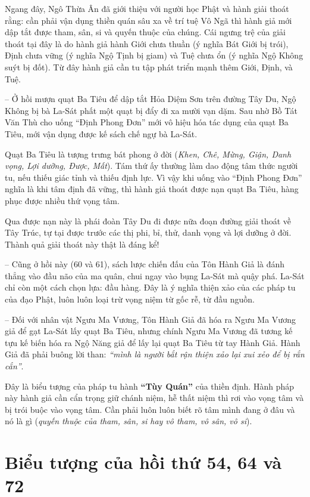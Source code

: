 Ngang đây, Ngô Thừa Ân đã giới thiệu với người học Phật và hành giải thoát rằng: cần phải vận dụng thiền quán sâu xa về trí tuệ Vô Ngã thì hành giả mới dập tắt được tham, sân, si và quyến thuộc của chúng. Cái ngưng trệ của giải thoát tại đây là do hành giả hành Giới chưa thuần (ý nghĩa Bát Giới bị trói), Định chưa vững (ý nghĩa Ngộ Tịnh bị giam) và Tuệ chưa ổn (ý nghĩa Ngộ Không suýt bị đốt). Từ đây hành giả cần tu tập phát triển mạnh thêm Giới, Định, và Tuệ.

-- Ở hồi mượn quạt Ba Tiêu để dập tắt Hỏa Diệm Sơn trên đường Tây Du, Ngộ Không bị bà La-Sát phất một quạt bị đẩy đi xa mười vạn dặm. Sau nhờ Bồ Tát Văn Thù cho uống ``Định Phong Đơn'' mới vô hiệu hóa tác dụng của quạt Ba Tiêu, mới vận dụng được kế sách chế ngự bà La-Sát.

Quạt Ba Tiêu là tượng trưng bát phong ở đời (\emph{Khen, Chê, Mừng, Giận, Danh vọng, Lợi dưỡng, Được, Mất}). Tám thứ ấy thường làm dao động tâm thức người tu, nếu thiếu giác tỉnh và thiếu định lực. Vì vậy khi uống vào ``Định Phong Đơn'' nghĩa là khi tâm định đã vững, thì hành giả thoát được nạn quạt Ba Tiêu, hàng phục được nhiều thứ vọng tâm.

Qua được nạn này là phái đoàn Tây Du đi được nữa đoạn đường giải thoát về Tây Trúc, tự tại được trước các thị phi, bỉ, thử, danh vọng và lợi dưỡng ở đời. Thành quả giải thoát này thật là đáng kể!

-- Cũng ở hồi này (60 và 61), sách lược chiến đấu của Tôn Hành Giả là đánh thẳng vào đầu não của ma quân, chui ngay vào bụng La-Sát mà quậy phá. La-Sát chỉ còn một cách chọn lựa: đầu hàng. Đây là ý nghĩa thiện xảo của các pháp tu của đạo Phật, luôn luôn loại trừ vọng niệm từ gốc rễ, từ đầu nguồn.

-- Đối với nhân vật Ngưu Ma Vương, Tôn Hành Giả đã hóa ra Ngưu Ma Vương giả để gạt La-Sát lấy quạt Ba Tiêu, nhưng chính Ngưu Ma Vương đã tương kế tựu kế biến hóa ra Ngộ Năng giả để lấy lại quạt Ba Tiêu từ tay Hành Giả. Hành Giả đã phải buông lời than: \emph{``mình là người bắt rận thiện xảo lại xui xẻo để bị rắn cắn''}.

Đây là biểu tượng của pháp tu hành {\bf ``Tùy Quán''} của thiền định. Hành pháp này hành giả cần cẩn trọng giữ chánh niệm, hễ thất niệm thì rơi vào vọng tâm và bị trói buộc vào vọng tâm. Cần phải luôn luôn biết rõ tâm mình đang ở đâu và nó là gì (\emph{quyến thuộc của tham, sân, si hay vô tham, vô sân, vô si}).

\section{Biểu tượng của hồi thứ 54, 64 và 72} %
\label{sec:bieu_tuong_hoi_54_64_va_72}


